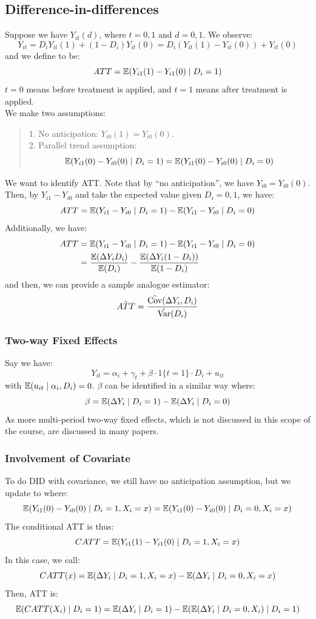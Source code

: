 \subsection{Difference-in-differences}
Suppose we have $Y_{it}(d)$, where $t = 0, 1$ and $d = 0, 1$. We observe:
$$Y_{it} = D_i Y_{it}(1) + (1 - D_i)Y_{it}(0) = D_i(Y_{it}(1) - Y_{it}(0)) + Y_{it}(0)$$
and we define  to be:
$$ATT = \mathbb{E}(Y_{i1}(1) - Y_{i1}(0) \mid D_i = 1)$$
$t = 0$ means before treatment is applied, and $t = 1$ means after treatment is applied. \\
We make two assumptions:
\begin{quote}
    1. No anticipation: $Y_{i0}(1) = Y_{i0}(0)$. \\
    2. Parallel trend assumption: 
    $$\mathbb{E}(Y_{i1}(0) - Y_{i0}(0) \mid D_i = 1) = \mathbb{E}(Y_{i1}(0) - Y_{i0}(0) \mid D_i = 0)$$
\end{quote}
We want to identify ATT. Note that by ``no anticipation'', we have $Y_{i0} = Y_{i0}(0)$. Then, by $Y_{i1} - Y_{i0}$ and take the expected value given $D_i = 0, 1$, we have:
$$ATT = \mathbb{E}(Y_{i1} - Y_{i0} \mid D_i = 1) - \mathbb{E}(Y_{i1} - Y_{i0} \mid D_i = 0)$$
Additionally, we have:
\begin{align*}
    ATT &= \mathbb{E}(Y_{i1} - Y_{i0} \mid D_i = 1) - \mathbb{E}(Y_{i1} - Y_{i0} \mid D_i = 0) \\
    &= \frac{\mathbb{E}(\Delta Y_i D_i)}{\mathbb{E}(D_i)} - \frac{\mathbb{E}(\Delta Y_i (1 - D_i))}{\mathbb{E}(1 - D_i)}
\end{align*}
and then, we can provide a sample analogue estimator:
$$\hat{ATT} = \frac{\hat{\text{Cov}}(\Delta Y_i, D_i)}{\hat{\text{Var}}(D_i)}$$

\subsubsection{Two-way Fixed Effects}
Say we have:
$$Y_{it} = \alpha_i + \gamma_t + \beta \cdot 1\{t = 1\} \cdot D_i + u_{it}$$
with $\mathbb{E}(u_{it} \mid \alpha_i, D_i) = 0$. $\beta$ can be identified in a similar way where:
$$\beta = \mathbb{E}(\Delta Y_i \mid D_i = 1) - \mathbb{E}(\Delta Y_i \mid D_i = 0)$$
As more multi-period two-way fixed effects, which is not discussed in this scope of the course, are discussed in many papers.

\subsubsection{Involvement of Covariate}
To do DID with covariance, we still have no anticipation assumption, but we update to  where:
$$\mathbb{E}(Y_{i1}(0) - Y_{i0}(0) \mid D_i = 1, X_i = x) = \mathbb{E}(Y_{i1}(0) - Y_{i0}(0) \mid D_i = 0, X_i = x)$$
The conditional ATT is thus:
$$CATT = \mathbb{E}(Y_{i1}(1) - Y_{i1}(0) \mid D_i = 1, X_i = x)$$
In this case, we call:
$$CATT(x) = \mathbb{E}(\Delta Y_i \mid D_i = 1, X_i = x) - \mathbb{E}(\Delta Y_i \mid D_i = 0, X_i = x)$$
Then, ATT is:
$$\mathbb{E}(CATT(X_i) \mid D_i = 1) = \mathbb{E}(\Delta Y_i \mid D_i = 1) - \mathbb{E}(\mathbb{E}(\Delta Y_i \mid D_i = 0, X_i) \mid D_i = 1)$$

